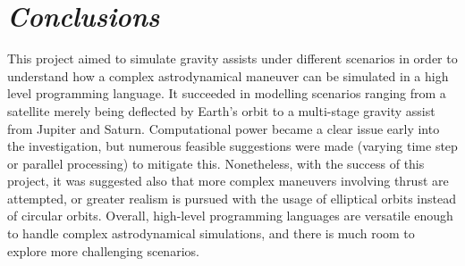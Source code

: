 \documentclass[11pt, english]{report}
\makeatletter
\renewcommand{\cftchappresnum}{Chapter }
\newcommand*\updatechaptername{%
	\addtocontents{toc}{\protect\renewcommand*\protect\cftchappresnum{\@chapapp\ }}
}
\renewcommand{\thefigure}{\Roman{chapter}.\arabic{figure}}
\renewcommand{\thetable}{\Roman{chapter}.\arabic{table}}
\makeatother
\begin{document}
\chapter{\textsl{Conclusions}}

\normalsize{\noindent This project aimed to simulate gravity assists under different scenarios in order to understand how a complex astrodynamical maneuver can be simulated in a high level programming language. It succeeded in modelling scenarios ranging from a satellite merely being deflected by Earth's orbit to a multi-stage gravity assist from Jupiter and Saturn. Computational power became a clear issue early into the investigation, but numerous feasible suggestions were made (varying time step or parallel processing) to mitigate this. Nonetheless, with the success of this project, it was suggested also that more complex maneuvers involving thrust are attempted, or greater realism is pursued with the usage of elliptical orbits instead of circular orbits. Overall, high-level programming languages are versatile enough to handle complex astrodynamical simulations, and there is much room to explore more challenging scenarios.}

%


\printbibliography
\clearpage

\renewcommand{\thefigure}{\Alph{chapter}.\arabic{figure}}
\renewcommand{\thetable}{\Alph{chapter}.\arabic{table}}

\updatechaptername
%
\end{document}
